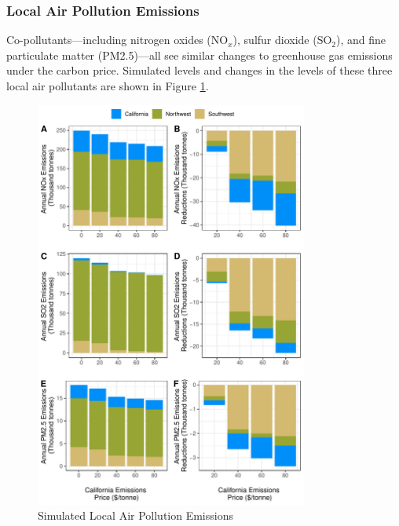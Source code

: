 \subsubsection*{Local Air Pollution Emissions}

Co-pollutants---including nitrogen oxides (NO$_x$), sulfur dioxide (SO$_2$), and fine particulate matter (PM2.5)---all see similar changes to greenhouse gas emissions under the carbon price. Simulated levels and changes in the levels of these three local air pollutants are shown in Figure \ref{sim_pol_bca}. 

\begin{figure}
    \centering
    \caption{Simulated Local Air Pollution Emissions\label{sim_pol_bca}}
    \includegraphics[width=0.8\textwidth]{figures/chapter5_figures/sim_pol_bca.pdf}
\end{figure}

